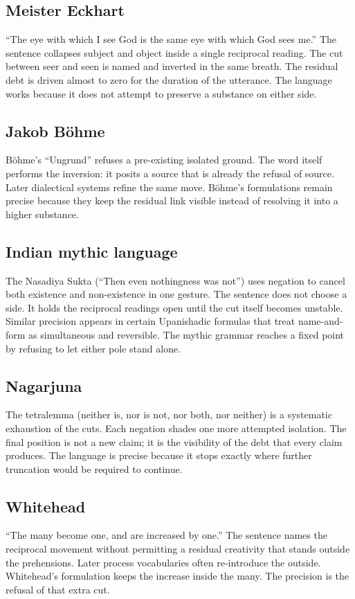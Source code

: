 \documentclass[11pt,a4paper]{article}
\begin{document}
\subsection{Meister Eckhart} ``The eye with which I see God is the same eye with which God sees me.'' The sentence collapses subject and object inside a single reciprocal reading. The cut between seer and seen is named and inverted in the same breath. The residual debt is driven almost to zero for the duration of the utterance. The language works because it does not attempt to preserve a substance on either side.

\subsection{Jakob Böhme} Böhme’s ``Ungrund'' refuses a pre-existing isolated ground. The word itself performs the inversion: it posits a source that is already the refusal of source. Later dialectical systems refine the same move. Böhme’s formulations remain precise because they keep the residual link visible instead of resolving it into a higher substance.

\subsection{Indian mythic language} The Nasadiya Sukta (``Then even nothingness was not'') uses negation to cancel both existence and non-existence in one gesture. The sentence does not choose a side. It holds the reciprocal readings open until the cut itself becomes unstable. Similar precision appears in certain Upanishadic formulas that treat name-and-form as simultaneous and reversible. The mythic grammar reaches a fixed point by refusing to let either pole stand alone.

\subsection{Nagarjuna} The tetralemma (neither is, nor is not, nor both, nor neither) is a systematic exhaustion of the cuts. Each negation shades one more attempted isolation. The final position is not a new claim; it is the visibility of the debt that every claim produces. The language is precise because it stops exactly where further truncation would be required to continue.

\subsection{Whitehead} ``The many become one, and are increased by one.'' The sentence names the reciprocal movement without permitting a residual creativity that stands outside the prehensions. Later process vocabularies often re-introduce the outside. Whitehead’s formulation keeps the increase inside the many. The precision is the refusal of that extra cut.
\end{document}
